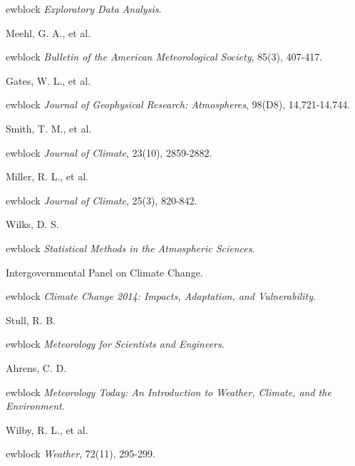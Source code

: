 \documentclass{article}
\begin{document}
\begin{thebibliography}{10}
ewblock {\em Exploratory Data Analysis}.

Meehl, G. A., et al.

ewblock {\em Bulletin of the American Meteorological Society}, 85(3), 407-417.

Gates, W. L., et al.

ewblock {\em Journal of Geophysical Research: Atmospheres}, 98(D8), 14,721-14,744.

Smith, T. M., et al.

ewblock {\em Journal of Climate}, 23(10), 2859-2882.

Miller, R. L., et al.

ewblock {\em Journal of Climate}, 25(3), 820-842.

Wilks, D. S.

ewblock {\em Statistical Methods in the Atmospheric Sciences}.

Intergovernmental Panel on Climate Change.

ewblock {\em Climate Change 2014: Impacts, Adaptation, and Vulnerability}.

Stull, R. B.

ewblock {\em Meteorology for Scientists and Engineers}.

Ahrens, C. D.

ewblock {\em Meteorology Today: An Introduction to Weather, Climate, and the Environment}.

Wilby, R. L., et al.

ewblock {\em Weather}, 72(11), 295-299.

\end{thebibliography}
\end{document}
